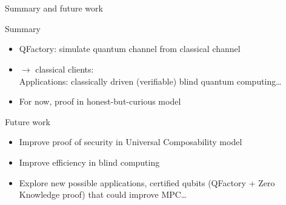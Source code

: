 \documentclass[]{beamer}
\begin{document}


\section{}
\begin{frame}{Summary and future work}
  \begin{block}{Summary}
    \begin{itemize}
    \item QFactory: simulate quantum channel from classical channel
    \item {} $\rightarrow$ classical clients:\\Applications: classically driven (verifiable) blind quantum computing\dots
    \item For now, proof in honest-but-curious model
    \end{itemize}
  \end{block}
  \begin{exampleblock}{Future work}
    \begin{itemize}
    \item Improve proof of security in Universal Composability model
    \item Improve efficiency in blind computing
    \item Explore new possible applications, certified qubits (QFactory + Zero Knowledge proof) that could improve MPC\dots
    \end{itemize}
  \end{exampleblock}
\end{frame}

\end{document}
